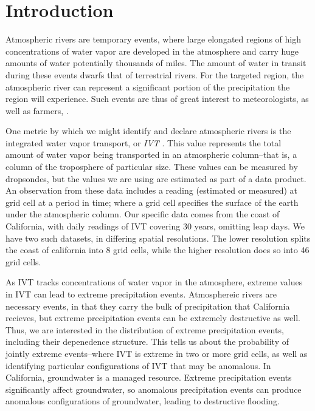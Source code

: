 
\section{Introduction}
Atmospheric rivers are temporary events, where large elongated regions of high concentrations of
  water vapor are developed in the atmosphere and carry huge amounts of water potentially thousands
  of miles.  The amount of water in transit during these events dwarfs that of terrestrial rivers.
  For the targeted region, the atmospheric river can represent a significant portion of the
  precipitation the region will experience.  Such events are thus of great interest to meteorologists,
  as well as farmers, .

One metric by which we might identify and declare atmospheric rivers is the integrated water vapor
  transport, or \emph{IVT} .  This value represents the total amount of water
  vapor being transported in an atmospheric column--that is, a column of the troposphere of particular
  size. These values can be measured by dropsondes, but the values we are using are estimated as part
  of a data product.  An observation from these data includes a reading (estimated
  or measured) at grid cell at a period in time; where a grid cell specifies the surface of the
  earth under the atmospheric column.  Our specific data comes from the coast of California,
  with daily readings of IVT covering 30 years, omitting leap days.  We have two such datasets, in
  differing spatial resolutions.  The lower resolution splits the coast of california into 8 grid
  cells, while the higher resolution does so into 46 grid cells.

As IVT tracks concentrations of water vapor in the atmosphere, extreme values in IVT can lead to
  extreme precipitation events.  Atmosphereic rivers are necessary events, in that they carry the
  bulk of precipitation that California recieves, but extreme precipitation events can be extremely
  destructive as well.  Thus, we are interested in the distribution of extreme precipitation events,
  including their depenedence structure.  This tells us about the probability of jointly extreme
  events--where IVT is extreme in two or more grid cells, as well as identifying particular
  configurations of IVT that may be anomalous.  In California, groundwater is a managed resource.
  Extreme precipitation events significantly affect groundwater, so anomalous precipitation events
  can produce anomalous configurations of groundwater, leading to destructive flooding.

